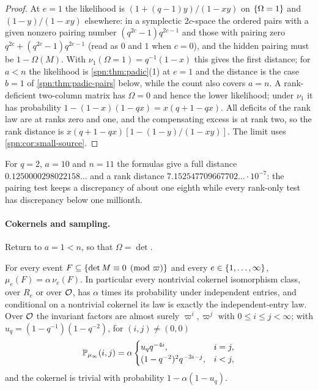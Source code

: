 \begin{proof}
At $e=1$ the likelihood is $(1+(q-1)y)/(1-xy)$ on $\{\Omega=1\}$ and $(1-y)/(1-xy)$ elsewhere:
in a symplectic $2c$-space the ordered pairs with a given nonzero pairing number
$(q^{2c}-1)q^{2c-1}$ and those with pairing zero $q^{2c}+(q^{2c}-1)q^{2c-1}$ (read as $0$ and $1$
when $c=0$), and the hidden pairing must be $1-\Omega(M)$. With $\nu_1(\Omega=1)=q^{-1}(1-x)$ this
gives the first distance; for $a<n$ the likelihood is \cref{spn:thm:padic}(1) at $e=1$ and the
distance is the case $b=1$ of \cref{spn:thm:padic-pairs} below, while the count also covers
$a=n$. A rank-deficient
two-column matrix has $\Omega=0$ and hence the lower likelihood; under $\nu_1$ it has probability
$1-(1-x)(1-qx)=x(q+1-qx)$. All deficits of the rank law are at ranks zero and one, and the
compensating excess is at rank two, so the rank distance is $x(q+1-qx)[1-(1-y)/(1-xy)]$. The limit
uses \cref{spn:cor:small-source}.
\end{proof}

For $q=2$, $a=10$ and $n=11$ the formulas give a full distance $0.1250000298022158\ldots$ and a
rank distance $7.152547709667702\ldots\cdot10^{-7}$: the pairing test keeps a discrepancy of about
one eighth while every rank-only test has discrepancy below one millionth.

\paragraph{Cokernels and sampling.} Return to $a=1<n$, so that $\Omega=\det$.

\begin{corollary}\label{spn:cor:padic-cokernel}
For every event $F\subseteq\{\det M\equiv0\pmod\varpi\}$ and every $e\in\{1,\dots,\infty\}$,
$\mu_e(F)=\alpha\,\nu_e(F)$. In particular every nontrivial cokernel isomorphism class, over $R_e$
or over $\mathcal{O}$, has $\alpha$ times its probability under independent entries, and conditional on a
nontrivial cokernel its law is exactly the independent-entry law. Over $\mathcal{O}$ the invariant factors
are almost surely $\varpi^i,\varpi^j$ with $0\le i\le j<\infty$; with $u_q=(1-q^{-1})(1-q^{-2})$,
for $(i,j)\ne(0,0)$
\[
 \mathbb{P}_{\mu_\infty}(i,j)=\alpha\begin{cases}u_qq^{-4i},&i=j,\\(1-q^{-2})^2q^{-3i-j},&i<j,\end{cases}
\]
and the cokernel is trivial with probability $1-\alpha(1-u_q)$.
\end{corollary}

